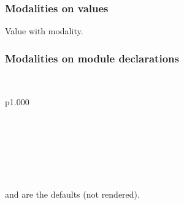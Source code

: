 \subsubsection{Modalities on values\label{Oxcaml--modalities-on-values}}%
\label{Oxcaml--val-portable_fn}\begin{ocamlindent}Value with  modality.\end{ocamlindent}%
\medbreak
\subsubsection{Modalities on module declarations\label{Oxcaml--modalities-on-module-declarations}}%
\label{Oxcaml--module-type-S}\label{Oxcaml-module-type-S}\begin{ocamlindent}\label{Oxcaml-module-type-S--type-s}\\
\begin{ocamltabular}{p{1.000\textwidth}}\label{Oxcaml-module-type-S--type-s.a}\\
\end{ocamltabular}%
\\
\ocamlcodefragment{\}}\\
\label{Oxcaml-module-type-S--val-x}\\
\label{Oxcaml-module-type-S--val-f}\\
\label{Oxcaml-module-type-S--val-portable}\\
\label{Oxcaml-module-type-S--val-contended}\\
 and  are the defaults (not rendered).

\label{Oxcaml-module-type-S--val-uncontended}\\
\label{Oxcaml-module-type-S--val-nonportable}\\
\end{ocamlindent}%
